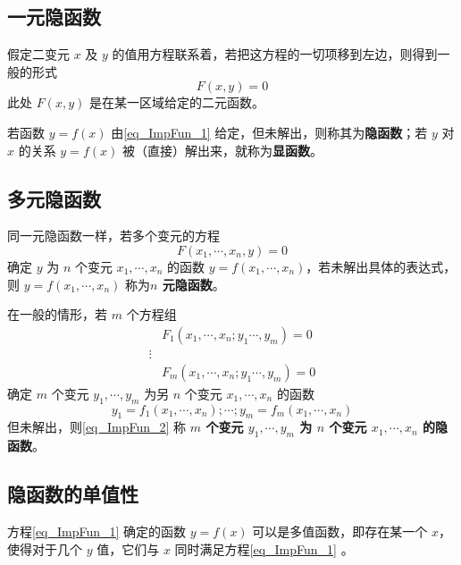 
\subsection{一元隐函数}
假定二变元 $x$ 及 $y$ 的值用方程联系着，若把这方程的一切项移到左边，则得到一般的形式
\begin{equation}\label{eq_ImpFun_1}
F(x,y)=0
\end{equation}
此处 $F(x,y)$ 是在某一区域给定的二元函数。

若函数 $y=f(x)$ 由\autoref{eq_ImpFun_1} 给定，但未解出，则称其为\textbf{隐函数}；若 $y$ 对 $x$ 的关系 $y=f(x)$ 被（直接）解出来，就称为\textbf{显函数}。
\subsection{多元隐函数}
同一元隐函数一样，若多个变元的方程
\begin{equation}\label{eq_ImpFun_5}
F(x_1,\cdots,x_n,y)=0
\end{equation}
确定 $y$ 为 $n$ 个变元 $x_1,\cdots,x_n$ 的函数 $y=f(x_1,\cdots,x_n)$，若未解出具体的表达式，则 $y=f(x_1,\cdots,x_n)$ 称为\textbf{$n$ 元隐函数}。 

在一般的情形，若 $m$ 个方程组
\begin{equation}\label{eq_ImpFun_6}
\begin{aligned}
&F_1(x_1,\cdots,x_n;y_1\cdots,y_m)=0\\
\vdots\\
&F_m(x_1,\cdots,x_n;y_1\cdots,y_m)=0
\end{aligned}
\end{equation}
确定 $m$ 个变元 $y_1,\cdots,y_m$ 为另 $n$ 个变元 $x_1,\cdots,x_n$ 的函数
\begin{equation}\label{eq_ImpFun_2}
y_1=f_1(x_1,\cdots,x_n);\cdots;y_m=f_m(x_1,\cdots,x_n)
\end{equation}
但未解出，则\autoref{eq_ImpFun_2} 称\textbf{ $m$ 个变元 $y_1,\cdots,y_m$ 为 $n$ 个变元 $x_1,\cdots,x_n$ 的隐函数}。 
\subsection{隐函数的单值性}
方程\autoref{eq_ImpFun_1} 确定的函数 $y=f(x)$ 可以是多值函数，即存在某一个 $x$，使得对于几个 $y$ 值，它们与 $x$ 同时满足方程\autoref{eq_ImpFun_1} 。

